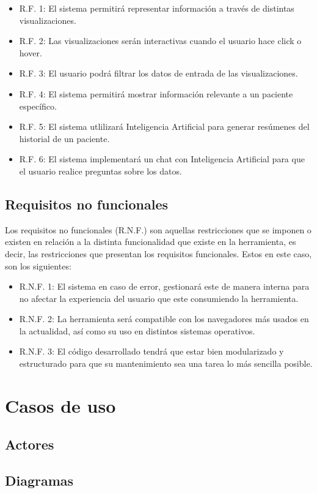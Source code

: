 \begin{itemize}
    \item R.F. 1: El sistema permitirá representar información a través de distintas visualizaciones.
    \item R.F. 2: Las visualizaciones serán interactivas cuando el usuario hace click o hover.
    \item R.F. 3: El usuario podrá filtrar los datos de entrada de las visualizaciones.
    \item R.F. 4: El sistema permitirá mostrar información relevante a un paciente específico.
    \item R.F. 5: El sistema utlilizará Inteligencia Artificial para generar resúmenes del historial de un paciente.
    \item R.F. 6: El sistema implementará un chat con Inteligencia Artificial para que el usuario realice preguntas sobre los datos.
    
\end{itemize}

\subsection{Requisitos no funcionales}

Los requisitos no funcionales (R.N.F.) son aquellas restricciones que se imponen o existen en relación a la distinta funcionalidad que existe en la herramienta, es decir, las restricciones que presentan los requisitos funcionales. Estos en este caso, son los siguientes:

\begin{itemize}
    \item R.N.F. 1: El sistema en caso de error, gestionará este de manera interna para no afectar la experiencia del usuario que este consumiendo la herramienta.
    \item R.N.F. 2: La herramienta será compatible con los navegadores más usados en la actualidad, así como su uso en distintos sistemas operativos. 
    \item R.N.F. 3: El código desarrollado tendrá que estar bien modularizado y estructurado para que su mantenimiento sea una tarea lo más sencilla posible.
    
\end{itemize}

\section{Casos de uso}

\subsection{Actores}

\subsection{Diagramas}

